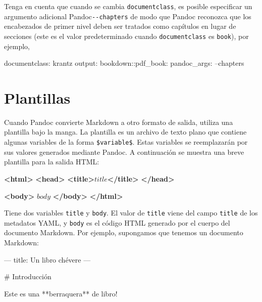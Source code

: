 \documentclass[12pt,]{krantz}
\makeatletter
\newenvironment{Shaded}{\begin{snugshade}}{\end{snugshade}}
\newcommand{\KeywordTok}[1]{\textcolor[rgb]{0.13,0.29,0.53}{\textbf{{#1}}}}
\newcommand{\FunctionTok}[1]{\textcolor[rgb]{0.00,0.00,0.00}{{#1}}}
\newcommand{\NormalTok}[1]{{#1}}
\newenvironment{kframe}{%
\medskip{}
\setlength{\fboxsep}{.8em}
 \def\at@end@of@kframe{}%
 \ifinner\ifhmode%
  \def\at@end@of@kframe{\end{minipage}}%
  \begin{minipage}{\columnwidth}%
 \fi\fi%
 \def\FrameCommand##1{\hskip\@totalleftmargin \hskip-\fboxsep
 \colorbox{shadecolor}{##1}\hskip-\fboxsep
     \hskip-\linewidth \hskip-\@totalleftmargin \hskip\columnwidth}%
 \MakeFramed {\advance\hsize-\width
   \@totalleftmargin\z@ \linewidth\hsize
   \@setminipage}}%
 {\par\unskip\endMakeFramed%
 \at@end@of@kframe}
\renewenvironment{Shaded}{\begin{kframe}}{\end{kframe}}
\theoremstyle{definition}
\theoremstyle{definition}
\theoremstyle{remark}
\makeatother
\begin{document}
Tenga en cuenta que cuando se cambia \texttt{documentclass}, es posible
especificar un argumento adicional Pandoc\texttt{-\/-chapters} de modo
que Pandoc reconozca que los encabezados de primer nivel deben ser
tratados como capítulos en lugar de secciones (este es el valor
predeterminado cuando \texttt{documentclass} es \texttt{book}), por
ejemplo,

\begin{Shaded}
\begin{Highlighting}[]
\FunctionTok{documentclass:} \NormalTok{krantz}
\FunctionTok{output:}
  \FunctionTok{bookdown:}\NormalTok{:pdf_book:}
    \FunctionTok{pandoc_args:} \NormalTok{--chapters}
\end{Highlighting}
\end{Shaded}

\section{Plantillas}\label{plantillas}

Cuando Pandoc convierte Markdown a otro formato de salida, utiliza una
plantilla bajo la manga. La plantilla es un archivo de texto plano que
contiene algunas variables de la forma \texttt{\$variable\$}. Estas
variables se reemplazarán por sus valores generados mediante Pandoc. A
continuación se muestra una breve plantilla para la salida HTML:

\begin{Shaded}
\begin{Highlighting}[]
\KeywordTok{<html>}
  \KeywordTok{<head>}
    \KeywordTok{<title>}\NormalTok{$title$}\KeywordTok{</title>}
  \KeywordTok{</head>}
  
  \KeywordTok{<body>}
  \NormalTok{$body$}
  \KeywordTok{</body>}
\KeywordTok{</html>}
\end{Highlighting}
\end{Shaded}

Tiene dos variables \texttt{title} y \texttt{body}. El valor de
\texttt{title} viene del campo \texttt{title} de los metadatos YAML, y
\texttt{body} es el código HTML generado por el cuerpo del documento
Markdown. Por ejemplo, supongamos que tenemos un documento Markdown:

\begin{Shaded}
\begin{Highlighting}[]
\NormalTok{---}
\NormalTok{title: Un libro chévere}
\NormalTok{---}

\FunctionTok{# Introducción}

\NormalTok{Este es una **berraquera** de libro!}
\end{Highlighting}
\end{Shaded}
\end{document}
